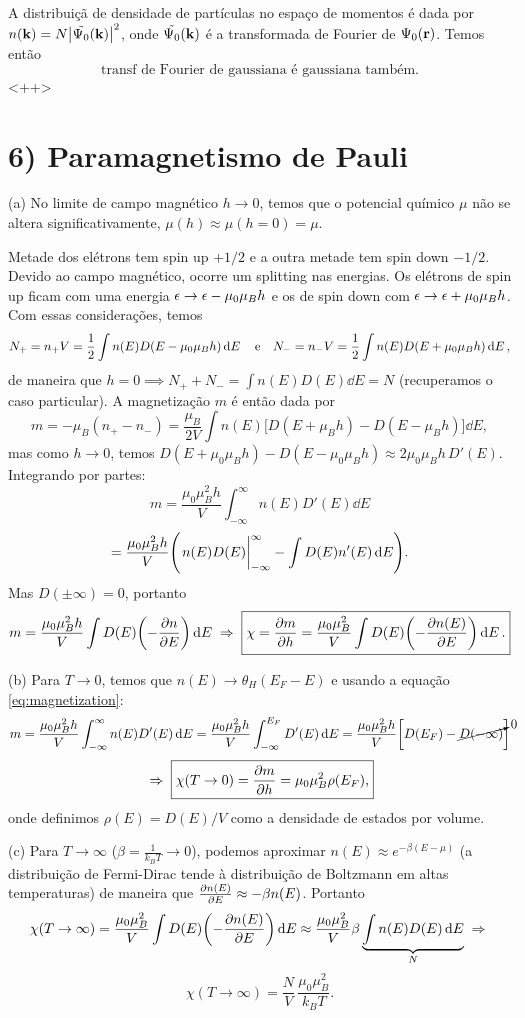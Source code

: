 \documentclass[a4paper,10pt]{article}
\begin{document}
\n

A distribuiçã de densidade de partículas no espaço de momentos é dada por $n(\vb{k}) = N\abs{\tilde{\Psi_0}(\vb{k})}^2$, onde $\tilde{\Psi_0}(\vb{k})$ é a transformada de Fourier de $\Psi_0(\vb{r})$. Temos então
$$
\text{transf de Fourier de gaussiana é gaussiana também.}
$$
<++>


\pagebreak

\section*{6) Paramagnetismo de Pauli}

(a) No limite de campo magnético $h \to 0$, temos que o potencial químico $\mu$ não se altera significativamente, $\mu(h) \approx \mu(h = 0) = \mu$.

Metade dos elétrons tem spin up $+1/2$ e a outra metade tem spin down $-1/2$. Devido ao campo magnético, ocorre um splitting nas energias. Os elétrons de spin up ficam com uma energia $\epsilon \to \epsilon - \mu_0 \mu_B h$ e os de spin down com $\epsilon \to \epsilon + \mu_0 \mu_B h$. Com essas considerações, temos
$$
N_+ = n_+ V = \frac{1}{2} \int n(E) D(E - \mu_0 \mu_B h) \dd{E} \quad \mathrm{e} \quad
N_- = n_- V = \frac{1}{2} \int n(E) D(E + \mu_0 \mu_B h) \dd{E},
$$
de maneira que $h = 0 \implies N_+ + N_- = \int n(E) D(E) \dd{E} = N$ (recuperamos o caso particular). A magnetização $m$ é então dada por
$$
m = - \mu_B (n_+ - n_-) =
\frac{\mu_B}{2V} \int n(E) \Big[ D(E + \mu_B h) - D(E - \mu_B h) \Big] \dd{E},
$$
mas como $h \to 0$, temos $D(E + \mu_0 \mu_B h) - D(E - \mu_0 \mu_B h) \approx 2 \mu_0 \mu_B h \, D'(E)$. Integrando por partes:
\begin{equation} \label{eq:magnetization}
m = \frac{\mu_0 \mu_B^2 h}{V} \int_{-\infty}^{\infty} n(E) D'(E) \dd{E}
\end{equation}
$$
= \frac{\mu_0 \mu_B^2 h}{V} \qty(\eval{n(E) D(E)}_{-\infty}^{\infty} - \int D(E) n'(E) \dd{E} ).
$$
Mas $D(\pm\infty) = 0$, portanto
$$
m = \frac{\mu_0 \mu_B^2 h}{V} \int D(E) \qty(- \pdv{n}{E}) \dd{E} \; \Rightarrow \;
\boxed{ \chi = \pdv{m}{h} = \frac{\mu_0 \mu_B^2}{V} \int D(E) \qty(- \pdv{n(E)}{E}) \dd{E}. }
$$

\n\n

(b) Para $T \to 0$, temos que $n(E) \to \theta_H(E_F-E)$ e usando a equação \ref{eq:magnetization}:
$$
m = \frac{\mu_0 \mu_B^2 h}{V} \int_{-\infty}^{\infty} n(E) D'(E) \dd{E} =
\frac{\mu_0 \mu_B^2 h}{V} \int_{-\infty}^{E_F} D'(E) \dd{E} =
\frac{\mu_0 \mu_B^2 h}{V} \qty[ D(E_F) - \cancelto{0}{D(-\infty)} ]
$$
$$
\; \Rightarrow \; \boxed{ \chi(T\to 0) = \pdv{m}{h} = \mu_0 \mu_B^2 \rho(E_F), }
$$
onde definimos $\rho(E) = D(E) / V$ como a densidade de estados por volume.

\n\n

(c) Para $T \to \infty$ ($\beta = \frac{1}{k_B T} \to 0$), podemos aproximar $n(E) \approx e^{-\beta(E - \mu)}$ (a distribuição de Fermi-Dirac tende à distribuição de Boltzmann em altas temperaturas) de maneira que $\pdv{n(E)}{E} \approx -\beta n(E)$. Portanto
$$
\chi(T \to \infty) = \frac{\mu_0\mu_B^2}{V} \int D(E) \qty(- \pdv{n(E)}{E}) \dd{E} \approx
\frac{\mu_0\mu_B^2}{V} \beta \underbrace{\int n(E) D(E) \dd{E}}_{N} \; \Rightarrow \;
$$
$$
\boxed{ \chi(T\to\infty) = \frac{N}{V} \, \frac{\mu_0 \mu_B^2}{k_B T}. }
$$

\pagebreak
\end{document}
